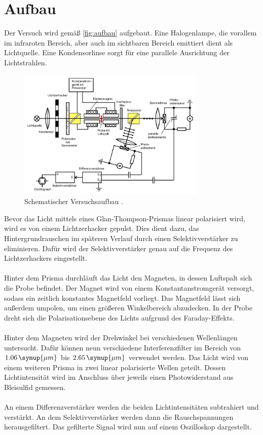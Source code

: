 \section{Aufbau}
\label{sec:Aufbau}

Der Versuch wird gemäß \autoref{fig:aufbau} aufgebaut. Eine Halogenlampe, die vorallem im infraroten Bereich, aber auch im sichtbaren Bereich 
emittiert dient als Lichtquelle. Eine Kondensorlinse sorgt für eine parallele Ausrichtung der 
Lichtstrahlen.

\begin{figure}
    \centering
    \includegraphics[width=0.8\textwidth]{Aufbau.pdf}
    \caption{Schematischer Versuchsaufbau \cite{ap46}.}
    \label{fig:aufbau}
\end{figure}

Bevor das Licht mittels eines Glan-Thompson-Prismas linear polarisiert wird, wird es von einem Lichtzerhacker gepulst. 
Dies dient dazu, das Hintergrundrauschen im späteren Verlauf durch einen Selektivverstärker zu eliminieren. Dafür wird der 
Selektivverstärker genau auf die Frequenz des Lichtzerhackers eingestellt. \\
\\
Hinter dem Prisma durchläuft das Licht den Magneten, in dessen Luftspalt sich die Probe befindet. Der Magnet wird von einem 
Konstantanstromgerät versorgt, sodass ein zeitlich konstantes Magnetfeld vorliegt. Das Magnetfeld lässt sich außerdem umpolen, um einen 
größeren Winkelbereich abzudecken. In der Probe dreht sich die Polarisationsebene des Lichts aufgrund des Faraday-Effekts. \\
\\
Hinter dem Magneten wird der Drehwinkel bei verschiedenen Wellenlängen untersucht. Dafür können neun 
verschiedene Interferenzfilter im Bereich von $1.06 \,\symup{\mu m}$ bis $2.65 \,\symup{\mu m}$ verwendet werden. Das Licht wird von einem weiteren 
Prisma in zwei linear polarisierte Wellen geteilt. Dessen Lichtintensität wird im Anschluss über jeweils einen Photowiderstand aus Bleisulfid gemessen. \\
\\
An einem Differenzverstärker werden die beiden Lichtintensitäten subtrahiert und verstärkt. An dem Selektivverstärker werden dann die Rauschspannungen 
herausgefiltert. Das gefilterte Signal wird nun auf einem Oszilloskop dargestellt.